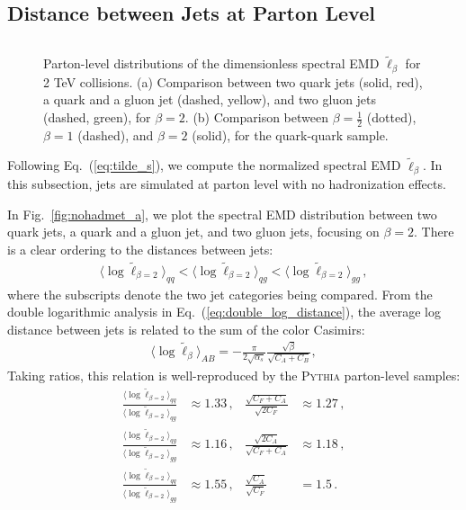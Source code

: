 \documentclass[letterpaper,11pt]{article}
\DeclareRobustCommand{\Fig}[1]{Fig.~\ref{#1}}
\DeclareRobustCommand{\Eq}[1]{Eq.~(\ref{#1})}
\begin{document}
\subsection{Distance between Jets at Parton Level}


\begin{figure}[t]
\begin{center}
$\quad$
\caption{
%
\label{fig:nohadmet}
%
Parton-level distributions of the dimensionless spectral EMD $\tilde \ell_{\beta}$ for 2 TeV collisions.
%
(a) Comparison between two quark jets (solid, red), a quark and a gluon jet (dashed, yellow), and two gluon jets (dashed, green), for $\beta = 2$.
%
(b) Comparison between $\beta = \frac{1}{2}$ (dotted), $\beta = 1$ (dashed), and $\beta =2$ (solid), for the quark-quark sample. 
}
\end{center}
\end{figure}


Following \Eq{eq:tilde_s}, we compute the normalized spectral EMD $\tilde\ell_{\beta}$.
%
In this subsection, jets are simulated at parton level with no hadronization effects.  


In \Fig{fig:nohadmet_a}, we plot the spectral EMD distribution between two quark jets, a quark and a gluon jet, and two gluon jets, focusing on $\beta = 2$.
%
There is a clear ordering to the distances between jets:
%
\begin{align}
\big\langle \log \tilde \ell_{\beta = 2} \big\rangle_{qq} <  \big\langle \log \tilde \ell_{\beta = 2} \big\rangle_{qg} <  \big\langle \log \tilde \ell_{\beta = 2} \big\rangle_{gg}\,,
\end{align}
%
where the subscripts denote the two jet categories being compared.  
%
From the double logarithmic analysis in \Eq{eq:double_log_distance}, the average log distance between jets is related to the sum of the color Casimirs:
%
\begin{align}
\label{eq:expval_dist}
\big\langle \log \tilde \ell_\beta \big\rangle_{AB} = - \frac{\pi}{2\sqrt{\alpha_s}} \frac{\sqrt{\beta}}{\sqrt{C_A+C_B}},
\end{align}
%
Taking ratios, this relation is well-reproduced by the \textsc{Pythia} parton-level samples:
%
\begin{align}
\frac{\big\langle \log \tilde \ell_{\beta=2} \big\rangle_{qq}}{\big \langle \log \tilde \ell_{\beta=2} \big\rangle_{qg}} &\approx 1.33\,, & \frac{\sqrt{C_F+C_A}}{\sqrt{2C_F}} &\approx 1.27\,,\\
\frac{\big\langle \log \tilde \ell_{\beta=2} \big\rangle_{qg}}{\big \langle \log \tilde \ell_{\beta=2} \big\rangle_{gg}} &\approx 1.16\,, & \frac{\sqrt{2C_A}}{\sqrt{C_F+C_A}} &\approx 1.18\,,\\
\frac{\big\langle \log \tilde \ell_{\beta=2} \big\rangle_{qq}}{\big \langle \log \tilde \ell_{\beta=2} \big\rangle_{gg}} &\approx 1.55\,, & \frac{\sqrt{C_A}}{\sqrt{C_F}} &= 1.5\,.
\end{align}
\end{document}
